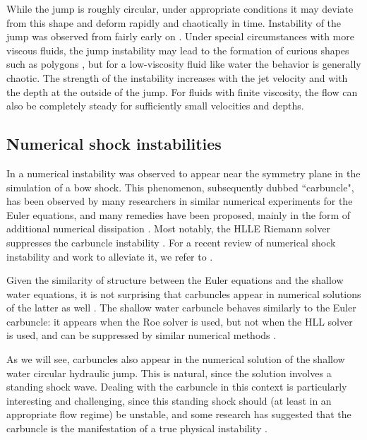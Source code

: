 \documentclass[preprint, 11pt]{article}
\begin{document}
While the jump is roughly circular, under appropriate conditions it may deviate
from this shape and deform rapidly and chaotically in time.
Instability of the jump was observed from fairly early on \cite{craik1981circular}.
Under special circumstances with more viscous fluids, the jump instability may lead to
the formation of curious shapes such as polygons \cite{ellegaard1998creating}, but
for a low-viscosity fluid like water the behavior is generally chaotic.
The strength of the instability increases with the jet velocity and with the
depth at the outside of the jump.  For fluids with finite viscosity, the flow
can also be completely steady for sufficiently small velocities and depths.


\subsection{Numerical shock instabilities}

In \cite{peery1988blunt} a numerical instability was observed to
appear near the symmetry plane in the simulation of a bow shock.
This phenomenon, subsequently dubbed ``carbuncle", has been observed by many researchers
in similar numerical experiments for the Euler equations, and many remedies
have been proposed, mainly in the form of additional numerical dissipation
\cite{quirk1997contribution,pandolfi2001numerical,dumbser2004matrix,chauvat2005shock,ismail2009proposed,shen2014stability}.
Most notably, the HLLE Riemann solver suppresses the carbuncle instability \cite{quirk1997contribution}.
For a recent review of numerical shock instability and work to alleviate it,
we refer to \cite[Section 2.5]{simonnumerical}.

Given the similarity of structure between the Euler equations and the shallow
water equations, it is not surprising that carbuncles appear in numerical
solutions of the latter as well \cite{kemm2014note}.
The shallow water carbuncle behaves similarly to the
Euler carbuncle: it appears when the Roe solver is used, but not when
the HLL solver is used, and can be suppressed by similar numerical methods
\cite{kemm2014note,bader2014carbuncle}.

As we will see, carbuncles also appear in the numerical solution of the shallow
water circular hydraulic jump.  This is natural, since the solution involves a
standing shock wave.  Dealing with the carbuncle in this context is particularly
interesting and challenging, since this standing shock should (at least in an
appropriate flow regime) be unstable, and some research has suggested that the
carbuncle is the manifestation of a true physical
instability \cite{moschetta2001carbuncle,elling2009carbuncle}.
\end{document}
